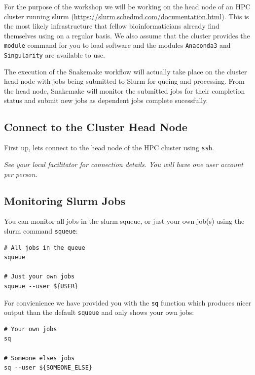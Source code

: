 For the purpose of the workshop we will be working on the head node of an HPC cluster running slurm (\url{https://slurm.schedmd.com/documentation.html}).
This is the most likely infrastructure that fellow bioinformaticians already find themselves using
on a regular basis. We also assume that the cluster provides the \texttt{module} command for you to
load software and the modules \texttt{Anaconda3} and \texttt{Singularity} are available to use.

The execution of the Snakemake workflow will actually take place on the cluster head node with jobs
being submitted to Slurm for queing and processing. From the head node, Snakemake will monitor the
submitted jobs for their completion status and submit new jobs as dependent jobs complete sucessfully.

\subsection{Connect to the Cluster Head Node}

\begin{steps}
First up, lets connect to the head node of the HPC cluster using \texttt{ssh}.

\emph{See your local facilitator for connection details. You will have one user account per person.}
\end{steps}

\subsection{Monitoring Slurm Jobs}

\begin{note}

You can monitor all jobs in the slurm squeue, or just your own job(s) using the slurm command \texttt{squeue}:

\begin{lstlisting}
# All jobs in the queue
squeue

# Just your own jobs
squeue --user ${USER}
\end{lstlisting}

For convienience we have provided you with the \texttt{sq} function which produces nicer output than the default \texttt{squeue} and only shows your own jobs:

\begin{lstlisting}
# Your own jobs
sq

# Someone elses jobs
sq --user ${SOMEONE_ELSE}
\end{lstlisting}

\end{note}

